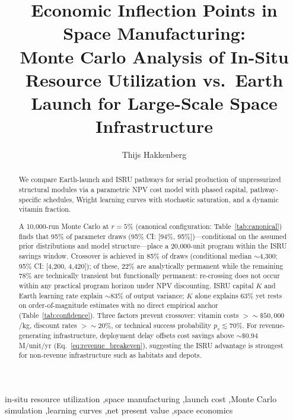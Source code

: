 \documentclass[preprint,12pt]{elsarticle}
\begin{document}
\begin{frontmatter}

\title{Economic Inflection Points in Space Manufacturing:\\ Monte Carlo Analysis of In-Situ Resource Utilization vs.\ Earth Launch for Large-Scale Space Infrastructure}

\author[dyson]{Thijs Hakkenberg}

\address[dyson]{Project Dyson, Open Research Initiative}

\begin{abstract}
We compare Earth-launch and ISRU pathways for serial production of unpressurized structural modules via a parametric NPV cost model with phased capital, pathway-specific schedules, Wright learning curves with stochastic saturation, and a dynamic vitamin fraction.

A 10{,}000-run Monte Carlo at $r = 5\%$ (canonical configuration: Table~\ref{tab:canonical}) finds that 95\% of parameter draws (95\% CI: [94\%, 95\%])---conditional on the assumed prior distributions and model structure---place a 20{,}000-unit program within the ISRU savings window. Crossover is achieved in 85\% of draws (conditional median ${\sim}$4{,}300; 95\% CI: [4{,}200, 4{,}420]); of these, 22\% are analytically permanent while the remaining 78\% are technically transient but functionally permanent: re-crossing does not occur within any practical program horizon under NPV discounting. ISRU capital $K$ and Earth learning rate explain ${\sim}$83\% of output variance; $K$ alone explains 63\% yet rests on order-of-magnitude estimates with no direct empirical anchor (Table~\ref{tab:confidence}). Three factors prevent crossover: vitamin costs $> {\sim}\$50{,}000$/kg, discount rates $> {\sim}20\%$, or technical success probability $p_s \lesssim 70\%$. For revenue-generating infrastructure, deployment delay offsets cost savings above ${\sim}\$0.94$M/unit/yr (Eq.~\ref{eq:revenue_breakeven}), suggesting the ISRU advantage is strongest for non-revenue infrastructure such as habitats and depots.
\end{abstract}

\begin{keyword}
in-situ resource utilization \sep space manufacturing \sep launch cost \sep Monte Carlo simulation \sep learning curves \sep net present value \sep space economics
\end{keyword}

\end{frontmatter}
\end{document}
